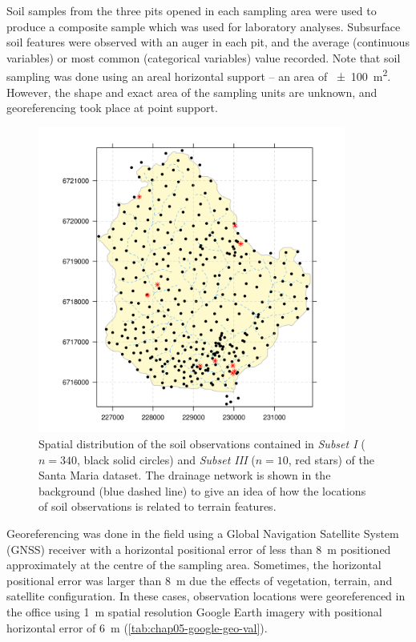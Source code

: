 Soil samples from the three pits opened in each sampling area were used to produce a composite sample which 
was used for laboratory analyses. Subsurface soil features were observed with an auger in each pit, and the 
average (continuous variables) or most common (categorical variables) value recorded. Note that soil sampling 
was done using an areal horizontal support -- an area of \SI{\pm100}{\metre\squared}. However, the shape and 
exact area of the sampling units are unknown, and georeferencing took place at point support.

\begin{figure}[!ht]
\centering
\includegraphics[width=0.90\textwidth]{fig/chap04-subsets-I-III}
\caption[Spatial distribution of \emph{Subset I} and \emph{Subset III}.]{Spatial distribution of the soil 
observations contained in \emph{Subset I} ($n = 340$, black solid circles) and \emph{Subset III} ($n = 
10$, red stars) of the Santa Maria dataset. The drainage network is shown in the background (blue 
dashed line) to give an idea of how the locations of soil observations is related to terrain features.}
\label{fig:chap04-subsets-I-III}
\end{figure}

Georeferencing was done in the field using a Global Navigation Satellite System (GNSS) receiver with a 
horizontal positional error of less than \SI{8}{\metre} positioned approximately at the centre of the
sampling area. Sometimes, the horizontal positional error was larger than \SI{8}{\metre} due the effects
of vegetation, terrain, and satellite configuration. In these cases, observation locations were georeferenced 
in the office using \SI{1}{\metre} spatial resolution Google Earth\rr{} imagery with positional horizontal 
error of \SI{6}{\metre} (\autoref{tab:chap05-google-geo-val}).

